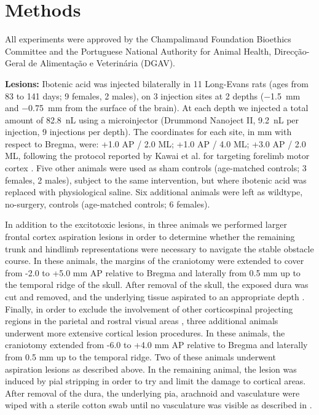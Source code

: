 \section{Methods}

All experiments were approved by the Champalimaud Foundation Bioethics Committee and the Portuguese National Authority for Animal Health, Direcção\hyp{}Geral de Alimentação e Veterinária (DGAV).

\textbf{Lesions:} Ibotenic acid was injected bilaterally in 11 Long-Evans rats (ages from 83 to 141 days; 9 females, 2 males), on 3 injection sites at 2 depths (\SI{-1.5}{\milli\meter} and \SI{-0.75}{\milli\meter} from the surface of the brain). At each depth we injected a total amount of \SI{82.8}{\nano\liter} using a microinjector (Drummond Nanoject II, \SI{9.2}{\nano\liter} per injection, 9 injections per depth). The coordinates for each site, in \si{\milli\meter} with respect to Bregma, were: +1.0 AP / 2.0 ML; +1.0 AP / 4.0 ML; +3.0 AP / 2.0 ML, following the protocol reported by Kawai et al. for targeting forelimb motor cortex \cite{Kawai2015}. Five other animals were used as sham controls (age-matched controls; 3 females, 2 males), subject to the same intervention, but where ibotenic acid was replaced with physiological saline. Six additional animals were left as wildtype, no-surgery, controls (age-matched controls; 6 females).

In addition to the excitotoxic lesions, in three animals we performed larger frontal cortex aspiration lesions in order to determine whether the remaining trunk and hindlimb representations were necessary to navigate the stable obstacle course. In these animals, the margins of the craniotomy were extended to cover from -2.0 to +5.0 \si{\milli\meter} AP relative to Bregma and laterally from 0.5 \si{\milli\meter} up to the temporal ridge of the skull. After removal of the skull, the exposed dura was cut and removed, and the underlying tissue aspirated to an appropriate depth \cite{Whishaw2000}. Finally, in order to exclude the involvement of other corticospinal projecting regions in the parietal and rostral visual areas \cite{Miller1987}, three additional animals underwent more extensive cortical lesion procedures. In these animals, the craniotomy extended from -6.0 to +4.0 \si{\milli\meter} AP relative to Bregma and laterally from 0.5 \si{\milli\meter} up to the temporal ridge. Two of these animals underwent aspiration lesions as described above. In the remaining animal, the lesion was induced by pial stripping in order to try and limit the damage to cortical areas. After removal of the dura, the underlying pia, arachnoid and vasculature were wiped with a sterile cotton swab until no vasculature was visible as described in \cite{Farr2002}.

